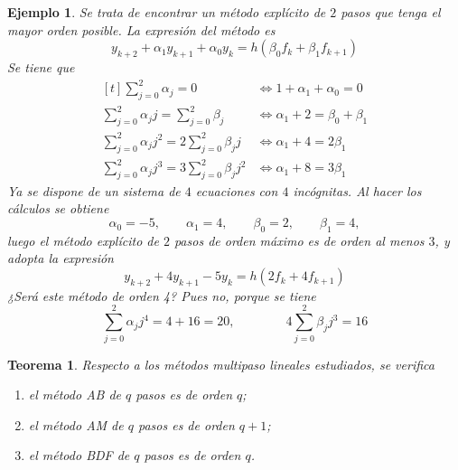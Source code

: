 \documentclass[11pt]{report}
\theoremstyle{mytheorem}
\newtheorem{theorem}{Teorema}
\theoremstyle{mydefinition}
\theoremstyle{myexample}
\newtheorem*{example}{Ejemplo}
\newenvironment{ctheorem} %
  {\begin{mdframed}[
        linewidth=3pt,
        linecolor=c2,
        bottomline=false,
        topline=false,
        rightline=false,
        innerrightmargin=0pt,
        innertopmargin=0pt,
        innerbottommargin=0pt,
        innerleftmargin=1em, %
        skipabove=\baselineskip]
    \begin{theorem}}
  {\end{theorem}\end{mdframed}}
\begin{document}
\begin{example}
Se trata de encontrar un método explícito de $2$ pasos que tenga el mayor orden posible. La expresión del método es
\[y_{k+2}+\alpha_1y_{k+1}+\alpha_0y_k = h\left(\beta_0f_k+\beta_1f_{k+1}\right)\]
Se tiene que
\[
\begin{aligned}[t]
    \sum_{j=0}^2 \alpha_j = 0 &\iff 1+\alpha_1+\alpha_0 = 0 \\
    \sum_{j=0}^2\alpha_jj=\sum_{j=0}^2\beta_j &\iff \alpha_1+2=\beta_0+\beta_1 \\
    \sum_{j=0}^2\alpha_jj^2=2\sum_{j=0}^2\beta_jj &\iff \alpha_1+4=2\beta_1 \\
    \sum_{j=0}^2\alpha_jj^3=3\sum_{j=0}^2\beta_jj^2 &\iff \alpha_1+8=3\beta_1     
\end{aligned}
\]
Ya se dispone de un sistema de $4$ ecuaciones con $4$ incógnitas. Al hacer los cálculos se obtiene
\[\alpha_0=-5, \qquad \alpha_1=4, \qquad \beta_0 = 2, \qquad \beta_1 = 4,\]
luego el método explícito de $2$ pasos de orden máximo es de orden al menos $3$, y adopta la expresión
\[y_{k+2}+4y_{k+1}-5y_k = h\left(2f_k+4f_{k+1}\right)\]
¿Será este método de orden 4? Pues no, porque se tiene
\[\sum_{j=0}^2\alpha_jj^4 = 4+16 = 20, \qquad \qquad 4\sum_{j=0}^2 \beta_jj^3 = 16\]
\end{example}

\begin{ctheorem}
Respecto a los métodos multipaso lineales estudiados, se verifica
\begin{enumerate}
    \item el método AB de $q$ pasos es de orden $q$;
    \item el método AM de $q$ pasos es de orden $q+1$;
    \item el método BDF de $q$ pasos es de orden $q$.
\end{enumerate}
\end{ctheorem}
\end{document}
